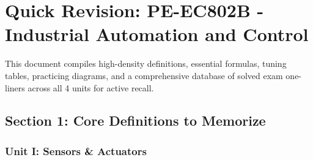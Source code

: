 \chapter{Quick Revision: PE-EC802B - Industrial Automation and Control}

This document compiles high-density definitions, essential formulas, tuning tables, practicing diagrams, and a comprehensive database of solved exam one-liners across all 4 units for active recall.


\section{Section 1: Core Definitions to Memorize}

\subsection{Unit I: Sensors \& Actuators}
